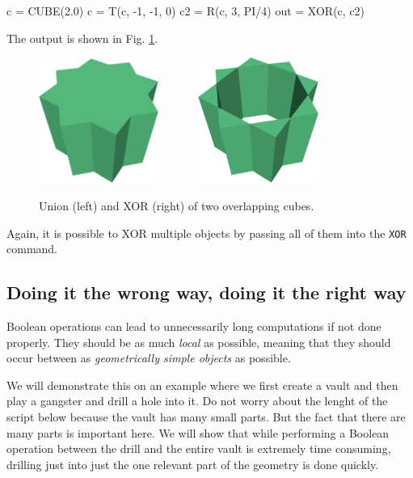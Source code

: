 \begin{bluecode}
c = CUBE(2.0)
c = T(c, -1, -1, 0)
c2 = R(c, 3, PI/4)
out = XOR(c, c2) 
\end{bluecode}
The output is shown in Fig. \ref{fig:xor-1}.
\newpage

\begin{figure}[!ht]
\begin{center}
\includegraphics[width=0.35\textwidth]{img/xor-new1a.png}\ \ \ \ \ \ \ 
\includegraphics[width=0.35\textwidth]{img/xor-new.png}
\end{center}
\vspace{-4mm}
\caption{Union (left) and XOR (right) of two overlapping cubes.}
\label{fig:xor-1}
\end{figure}
\noindent
Again, it is possible to XOR multiple objects by passing all of them 
into the {\tt XOR} command.

\subsection{Doing it the wrong way, doing it the right way}

Boolean operations can lead to unnecessarily long computations if not done 
properly. They should be as much {\em local} as possible, meaning that 
they should occur between as {\em geometrically simple objects} as possible.

We will demonstrate this on an example where we first create a vault and then play 
a gangster and drill a hole into it. Do not worry about the lenght of the script below  because
the vault has many small parts. But the fact that there are many parts is important here.
We will show that while performing a Boolean operation between the drill and the entire
vault is extremely time consuming, drilling just into just the one relevant part
of the geometry is done quickly.

